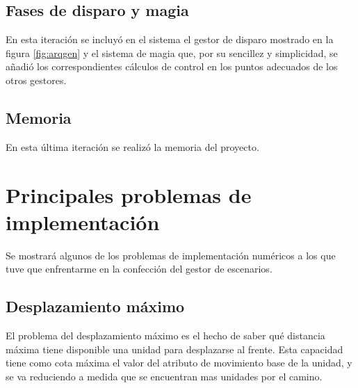 \documentclass[a4paper,11pt]{article} %
\begin{document}
\subsection{Fases de disparo y magia}
\label{sec:disp}
\noindent
En esta iteración se incluyó en el sistema el gestor de disparo
mostrado en la figura \ref{fig:arqgen} y el sistema de magia que, por
su sencillez y simplicidad, se añadió los correspondientes cálculos de
control en los puntos adecuados de los otros gestores.

\subsection{Memoria}
\label{sec:mem}
\noindent
En esta última iteración se realizó la memoria del proyecto.

\section{Principales problemas de implementación}
\noindent
Se mostrará algunos de los problemas de implementación numéricos a los
que tuve que enfrentarme en la confección del gestor de escenarios.

\subsection{Desplazamiento máximo}
\noindent
El problema del desplazamiento máximo es el hecho de saber qué
distancia máxima tiene disponible una unidad para desplazarse al
frente. Esta capacidad tiene como cota máxima el valor del atributo de
movimiento base de la unidad, y se va reduciendo a medida que se
encuentran mas unidades por el camino.\\
\end{document}
